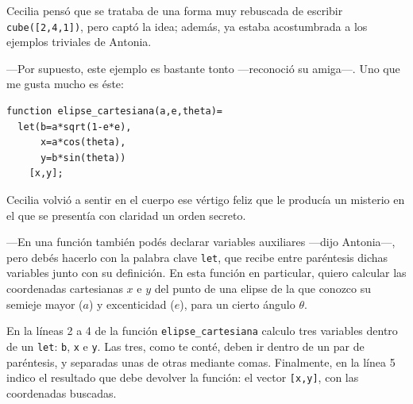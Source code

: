    Cecilia pensó que se trataba de una forma muy rebuscada de
    escribir \lstinline!cube([2,4,1])!, pero captó la idea; además, ya
    estaba acostumbrada a los ejemplos triviales de Antonia.

    ---Por supuesto, este ejemplo es bastante tonto ---re\-co\-no\-ció
    su amiga---. Uno que me gusta mucho es éste:

    \begin{lstlisting}
function elipse_cartesiana(a,e,theta)=
  let(b=a*sqrt(1-e*e), 
      x=a*cos(theta),
      y=b*sin(theta))
    [x,y];
    \end{lstlisting}

   Cecilia volvió a sentir en el cuerpo ese vértigo feliz que le
   producía un misterio en el que se presentía con claridad un orden
   secreto.

   ---En una función también podés declarar variables auxiliares
   ---dijo Antonia---, pero debés hacerlo con la palabra clave
   \lstinline!let!, que recibe entre paréntesis dichas variables junto
   con su definición. En esta función en particular, quiero calcular
   las coordenadas cartesianas $x$ e $y$ del punto de una elipse de la
   que conozco su semieje mayor ($a$) y excenticidad ($e$), para un
   cierto ángulo $\theta$.

   \guillemotright En la líneas 2 a 4 de la función
   \lstinline!elipse_cartesiana! calculo tres variables dentro de un
   \lstinline!let!: \texttt{b}, \texttt{x} e \texttt{y}. Las tres,
   como te conté, deben ir dentro de un par de paréntesis, y separadas
   unas de otras mediante comas. Finalmente, en la línea 5 indico el
   resultado que debe devolver la función: el vector \texttt{[x,y]},
   con las coordenadas buscadas.

